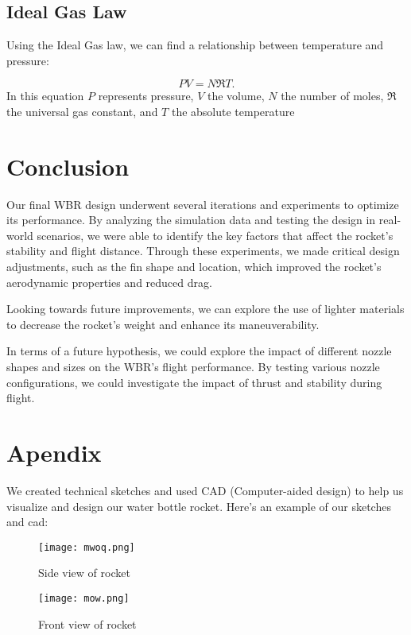 \documentclass[11pt]{article}
\begin{document}
\subsection{Ideal Gas Law}
Using the Ideal Gas law, we can find a relationship between temperature and pressure:

\begin{equation}
PV = N \Re T.
\end{equation}
In this equation $P$ represents pressure, $V$ the volume, $N$ the number of moles, $\Re$ the universal gas constant, and $T$ the absolute temperature


\section{Conclusion}

Our final WBR design underwent several iterations and experiments to optimize its performance. By analyzing the simulation data and testing the design in real-world scenarios, we were able to identify the key factors that affect the rocket's stability and flight distance. Through these experiments, we made critical design adjustments, such as the fin shape and location, which improved the rocket's aerodynamic properties and reduced drag.

Looking towards future improvements, we can explore the use of lighter materials to decrease the rocket's weight and enhance its maneuverability.

In terms of a future hypothesis, we could explore the impact of different nozzle shapes and sizes on the WBR's flight performance. By testing various nozzle configurations, we could investigate the impact of thrust and stability during flight.

\section{Apendix}
We created technical sketches and used CAD (Computer-aided design) to help us visualize and design our water bottle rocket. Here's an example of our sketches and cad:

\begin{figure}[H]
\begin{minipage}{.5\textwidth}
\centering
\texttt{[image: mwoq.png]}
\caption{Side view of rocket}
\label{fig:technical_sketch}
\end{minipage}%
\begin{minipage}{.5\textwidth}
\centering
\texttt{[image: mow.png]}
\caption{Front view of rocket}
\label{fig:Computer-aided design}
\end{minipage}%
\end{figure}
\end{document}
